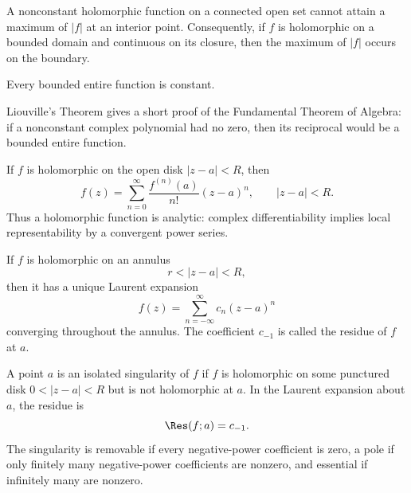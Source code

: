     \begin{theorem}
        A nonconstant holomorphic function on a connected open set cannot attain
        a maximum of $|f|$ at an interior point. Consequently, if $f$ is
        holomorphic on a bounded domain and continuous on its closure, then the
        maximum of $|f|$ occurs on the boundary.
    \end{theorem}

    \begin{theorem}
        Every bounded entire function is constant.
    \end{theorem}

    \begin{remark}
        Liouville's Theorem gives a short proof of the Fundamental Theorem of
        Algebra: if a nonconstant complex polynomial had no zero, then its
        reciprocal would be a bounded entire function.
    \end{remark}

    \begin{theorem}
        If $f$ is holomorphic on the open disk $|z-a|<R$, then
        \[
            f(z)
            =
            \sum_{n=0}^{\infty}
            \frac{f^{(n)}(a)}{n!}(z-a)^n,
            \qquad
            |z-a|<R.
        \]
        Thus a holomorphic function is analytic: complex differentiability implies
        local representability by a convergent power series.
    \end{theorem}

    \begin{theorem}
        If $f$ is holomorphic on an annulus
        \[
            r<|z-a|<R,
        \]
        then it has a unique Laurent expansion
        \[
            f(z)
            =
            \sum_{n=-\infty}^{\infty}c_n(z-a)^n
        \]
        converging throughout the annulus. The coefficient $c_{-1}$ is called the
        residue of $f$ at $a$.
    \end{theorem}

    \begin{definition}
        A point $a$ is an isolated singularity of $f$ if $f$ is holomorphic on
        some punctured disk $0<|z-a|<R$ but is not holomorphic at $a$. In the
        Laurent expansion about $a$, the residue is
        \[
            \Res(f;a)=c_{-1}.
        \]
        The singularity is removable if every negative-power coefficient is zero,
        a pole if only finitely many negative-power coefficients are nonzero, and
        essential if infinitely many are nonzero.
    \end{definition}

